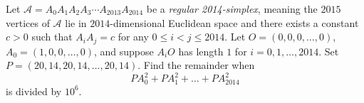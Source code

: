 Let $\mathcal A = A_0A_1A_2A_3 \cdots A_{2013}A_{2014}$ be a \emph{regular 2014-simplex}, meaning the $2015$ vertices of $\mathcal A$ lie in $2014$-dimensional Euclidean space and there exists a constant $c > 0$ such that $A_iA_j = c$ for any $0 \le i < j \le 2014$. Let $O = (0,0,0,\dots,0)$, $A_0 = (1,0,0,\dots,0)$, and suppose $A_iO$ has length $1$ for $i=0,1,\dots,2014$. Set $P=(20,14,20,14,\dots,20,14)$.  Find the remainder when \[PA_0^2 + PA_1^2 + \dots + PA_{2014}^2 \] is divided by $10^6$.
